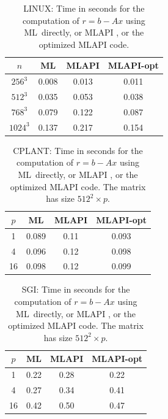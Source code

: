 \documentclass{article}[11pt]
\newcommand{\ML}     {{\sc ML}}
\newcommand{\MLAPI}  {{\sc MLAPI }}
\newcommand{\MLAPIns}  {{\sc MLAPI}}
\begin{document}
\begin{table}
\begin{center}
\begin{tabular}{| c | c c c |}
\hline
$n$ & \ML & \MLAPI & \MLAPIns-opt \\
\hline
$256^3$  & 0.008 & 0.013 & 0.011 \\
$512^3$  & 0.035 & 0.053 & 0.038 \\
$768^3$  & 0.079 & 0.122 & 0.087 \\ 
$1024^3$ & 0.137 & 0.217 & 0.154 \\ 
\hline
\end{tabular}
\caption{LINUX: Time in seconds for the computation of $r = b - A x$ using \ML\ directly, or \MLAPI, or the optimized \MLAPI code.}
\label{tab:linux-res}
\end{center}
\end{table}


\begin{table}
\begin{center}
\begin{tabular}{| c | c c c |}
\hline
$p$ & \ML & \MLAPI & \MLAPIns-opt \\
\hline
 1 & 0.089 &  0.11  &  0.093 \\
 4 & 0.096 &  0.12  &  0.098 \\
16 & 0.098 &  0.12  &  0.099 \\
\hline
\end{tabular}
\caption{CPLANT: Time in seconds for the computation of $r = b - A x$ using
  \ML\ directly, or \MLAPI, or the optimized \MLAPI code. 
  The matrix has size $512^2 \times p$.}
\label{tab:cplant-res}
\end{center}
\end{table}

\begin{table}
\begin{center}
\begin{tabular}{| c | c c c |}
\hline
$p$ & \ML & \MLAPI & \MLAPIns-opt \\
\hline
 1 & 0.22 &  0.28  &  0.22 \\
 4 & 0.27 &  0.34  &  0.41 \\
16 & 0.42 &  0.50  &  0.47 \\
\hline
\end{tabular}
\caption{SGI: Time in seconds for the computation of $r = b - A x$ using
  \ML\ directly, or \MLAPI, or the optimized \MLAPI code. 
  The matrix has size $512^2 \times p$.}
\label{tab:sgi-res}
\end{center}
\end{table}
\end{document}
